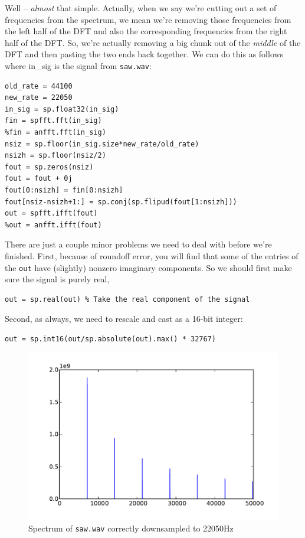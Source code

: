 Well -- \emph{almost} that simple. Actually, when we say we're cutting out a set of frequencies from the spectrum, we mean we're removing those frequencies from the left half of the DFT and also the corresponding frequencies from the right half of the DFT. So, we're actually removing a big chunk out of the \emph{middle} of the DFT and then pasting the two ends back together. We can do this as follows where in\_sig is the signal from \texttt{saw.wav}:
\begin{lstlisting}
old_rate = 44100
new_rate = 22050
in_sig = sp.float32(in_sig)
fin = spfft.fft(in_sig)
%fin = anfft.fft(in_sig)
nsiz = sp.floor(in_sig.size*new_rate/old_rate)
nsizh = sp.floor(nsiz/2)
fout = sp.zeros(nsiz)
fout = fout + 0j
fout[0:nsizh] = fin[0:nsizh]
fout[nsiz-nsizh+1:] = sp.conj(sp.flipud(fout[1:nsizh]))
out = spfft.ifft(fout)
%out = anfft.ifft(fout)
\end{lstlisting}
There are just a couple minor problems we need to deal with before we're finished. First, because of roundoff error, you will find that some of the entries of the \texttt{out} have (slightly) nonzero imaginary components.  So we should first make sure the signal is purely real,
\begin{lstlisting}
out = sp.real(out) % Take the real component of the signal
\end{lstlisting}
Second, as always, we need to rescale and cast as a 16-bit integer:
\begin{lstlisting}
out = sp.int16(out/sp.absolute(out).max() * 32767)
\end{lstlisting}


\begin{figure}[ht]\caption{Spectrum of \texttt{saw.wav} correctly downsampled to 22050Hz}\label{sawspecdown2}\centering\includegraphics[width=\textwidth]{sawdownspec}\end{figure}

